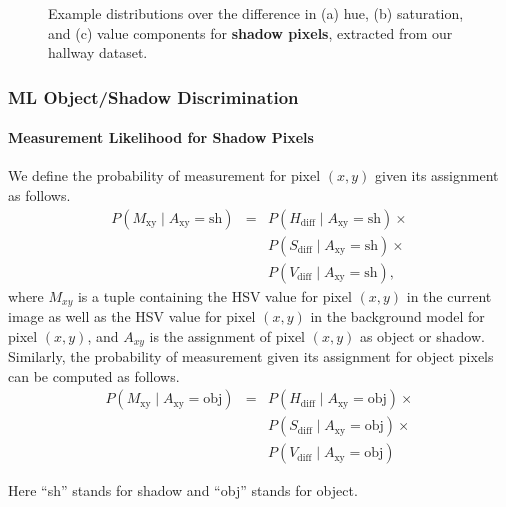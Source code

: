 \begin{frame}
\begin{figure}
        \caption{Example distributions over the difference in (a) hue, (b)
            saturation, and (c) value components for {\bf shadow pixels},
            extracted from our hallway dataset.}
        \label{fig:shadow-distribution}
    \end{figure}

\end{frame}


\begin{frame}
    \frametitle{ML Object/Shadow Discrimination}
    \framesubtitle{Measurement Likelihood for Shadow Pixels}

    We define the probability of measurement for pixel $(x, y)$ given its
    assignment as follows.
    \begin{equation*}
        \label{eq:shadow-measurement}
        \begin{array}{ccl}
            P(M_{\text{xy}} \mid A_{\text{xy}} = \text{sh}) 
                & = & P(H_{\text{diff}} \mid A_{\text{xy}} = \text{sh}) \times \\
                &   & P(S_{\text{diff}} \mid A_{\text{xy}} = \text{sh}) \times \\
                &   & P(V_{\text{diff}} \mid A_{\text{xy}} = \text{sh}),
        \end{array}
    \end{equation*}
    where $M_{xy}$ is a tuple containing the HSV value for pixel $(x,y)$
    in the current image as well as the HSV value for pixel $(x,y)$ in the
    background model for pixel $(x,y)$, and $A_{xy}$ is the assignment of
    pixel $(x,y)$ as object or shadow.  
    Similarly, the probability of measurement given its assignment 
    for object pixels can be computed as follows.
    \begin{equation*}
        \label{eq:foreground-measurement}
        \begin{array}{ccl}
            P(M_{\text{xy}} \mid A_{\text{xy}} = \text{obj}) 
                & = & P(H_{\text{diff}} \mid A_{\text{xy}} = \text{obj}) \times \\
                &   & P(S_{\text{diff}} \mid A_{\text{xy}} = \text{obj}) \times \\
                &   & P(V_{\text{diff}} \mid A_{\text{xy}} = \text{obj})
        \end{array}
    \end{equation*}
  
    Here ``sh'' stands for shadow and ``obj'' stands for object. 

\end{frame}

